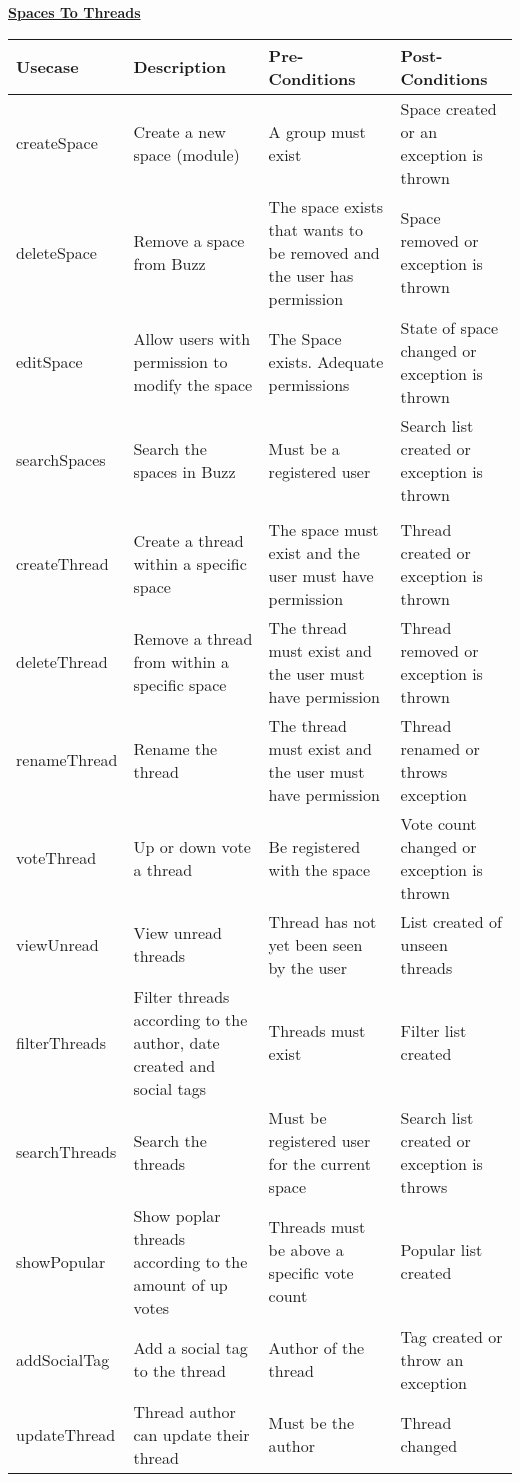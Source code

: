 \documentclass{report}
\begin{document}
	
	\underline{\textbf{\LARGE Spaces To Threads}}
	\begin{table}[h]
		\begin{tabular}{@{}|p{3cm}|p{3cm}|p{3cm}|p{3cm}|@{}}
			\toprule
			\textbf{Usecase} & \textbf{Description} & \textbf{Pre-Conditions} & \textbf{Post-Conditions} \\ \midrule
			
			createSpace& Create a new space (module)& A group must exist & Space created or an exception is thrown \\ \midrule
			deleteSpace& Remove a space from Buzz& The space exists that wants to be removed and the user has permission& Space removed or exception is thrown \\ \midrule
			editSpace& Allow users with permission to modify the space& The Space exists. Adequate permissions& State of space changed or exception is thrown \\ \midrule
			searchSpaces& Search the spaces in Buzz& Must be a registered user& Search list created or exception is thrown \\ \midrule
			&             &                &                 \\ \midrule
			createThread& Create a thread within a specific space& The space must exist and the user must have permission& Thread created or exception is thrown \\ \midrule
			deleteThread& Remove a thread from within a specific space& The thread must exist and the user must have permission& Thread removed or exception is thrown \\ \midrule
			renameThread& Rename the thread& The thread must exist and the user must have permission & Thread renamed or throws exception \\ \midrule
			voteThread& Up or down vote a thread& Be registered with the space& Vote count changed or exception is thrown \\ \midrule
			viewUnread& View unread threads& Thread has not yet been seen by the user& List created of unseen threads \\ \midrule
			filterThreads& Filter threads according to the author, date created and social tags& Threads must exist& Filter list created \\ \midrule
			searchThreads& Search the threads& Must be registered user for the current space& Search list created or exception is throws \\ \midrule
			showPopular& Show poplar threads according to the amount of up votes& Threads must be above a specific vote count&  Popular list created \\ \midrule
			addSocialTag& Add a social tag to the thread& Author of the thread& Tag created or throw an exception \\ \midrule
			updateThread& Thread author can update their thread& Must be the author& Thread changed \\ \bottomrule
		                 
		\end{tabular}
	\end{table}
\end{document}
